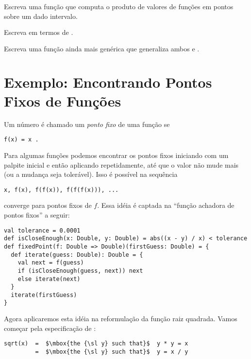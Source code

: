 \begin{exercise}
Escreva uma fun\c{c}\~{a}o  que computa o produto de valores de
fun\c{c}\~{o}es em pontos sobre um dado intervalo.  
\end{exercise}

\begin{exercise}
Escreva  em termos de .  
\end{exercise}

\begin{exercise}
Escreva uma fun\c{c}\~{a}o ainda mais gen\'{e}rica que generaliza ambos  e .  
\end{exercise}

\section{Exemplo: Encontrando Pontos Fixos de Fun\c{c}\~{o}es}

Um n\'{u}mero  \'{e} chamado um {\em ponto fixo} de uma fun\c{c}\~{a}o  se  
\begin{lstlisting}
f(x) = x .
\end{lstlisting}

Para algumas fun\c{c}\~{o}es  podemos encontrar os pontos fixos iniciando
com um palpite inicial e ent\~{a}o aplicando  repetidamente, at\'{e} que o valor 
n\~{a}o mude mais (ou a mudan\c{c}a seja toler\'{a}vel). Isso \'{e} poss\'{i}vel na sequ\^{e}ncia  
\begin{lstlisting}
x, f(x), f(f(x)), f(f(f(x))), ...
\end{lstlisting}
converge para pontos fixos de $f$. Essa id\'{e}ia \'{e} captada na ``fun\c{c}\~{a}o achadora 
de pontos fixos'' a seguir:
\begin{lstlisting}
val tolerance = 0.0001
def isCloseEnough(x: Double, y: Double) = abs((x - y) / x) < tolerance
def fixedPoint(f: Double => Double)(firstGuess: Double) = {
  def iterate(guess: Double): Double = {
    val next = f(guess)
    if (isCloseEnough(guess, next)) next
    else iterate(next)
  }
  iterate(firstGuess)
}
\end{lstlisting}

Agora aplicaremos esta id\'{e}ia na reformula\c{c}\~{a}o da fun\c{c}\~{a}o raiz quadrada.
Vamos come\c{c}ar pela especifica\c{c}\~{a}o de :  
\begin{lstlisting}
sqrt(x)  =  $\mbox{the {\sl y} such that}$  y * y = x
         =  $\mbox{the {\sl y} such that}$  y = x / y
\end{lstlisting}

